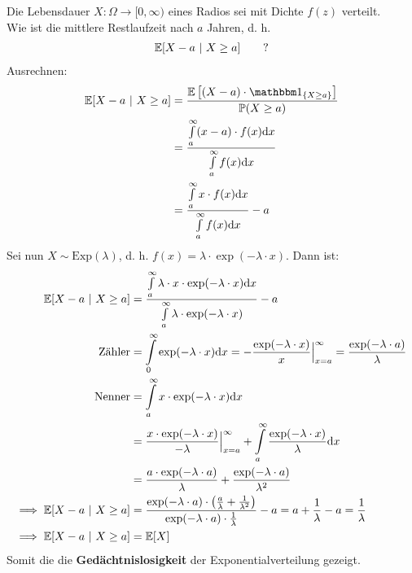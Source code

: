 \begin{beisp}[Lebensdaueranalyse]\enter
	Die Lebensdauer $X:\Omega\to[0,\infty)$ eines Radios sei mit Dichte $f(z)$ verteilt.\\
	Wie ist die mittlere Restlaufzeit nach $a$ Jahren, d. h. 
	\begin{align*}
		\mathbb{E}[X-a~|~X\geq a]\qquad?
	\end{align*}
	Ausrechnen:
	\begin{align*}
		\E[X-a~|~X\geq a] 
		&=\frac{\E\left[(X-a)\cdot\indi_{\{X\geq a\}}\right]}{\P(X\geq a)}\\
		&=\frac{\int\limits_a^\infty (x-a)\cdot f(x)\d x}{\int\limits_a^\infty f(x)\d x}\\
		&=\frac{\int\limits_a^\infty x\cdot f(x)\d x}{\int\limits_a^\infty f(x)\d x}-a
	\end{align*}
	Sei nun $X\sim\text{Exp}(\lambda)$, d. h. $f(x)=\lambda\cdot\exp(-\lambda\cdot x)$. Dann ist:
	\begin{align*}
		\mathbb{E}[X-a~|~X\geq a]
		&=\frac{\int\limits_a^\infty \lambda\cdot x\cdot\exp(-\lambda\cdot x)\mathrm{d} x}{\int\limits_a^\infty\lambda\cdot\exp(-\lambda\cdot x)}-a\\
		\text{Zähler}&=\int\limits_0^\infty\exp(-\lambda\cdot x)\mathrm{d} x=-\frac{\exp(-\lambda\cdot x)}{x}\Big|_{x=a}^\infty=\frac{\exp(-\lambda\cdot a)}{\lambda}\\
		\text{Nenner} &=\int\limits_a^\infty x\cdot\exp(-\lambda\cdot x)\mathrm{d} x\\
		&=\frac{x\cdot\exp(-\lambda\cdot x)}{-\lambda}\Big|_{x=a}^\infty+\int\limits_a^\infty\frac{\exp(-\lambda\cdot x)}{\lambda}\mathrm{d} x\\
		&=\frac{a\cdot\exp(-\lambda\cdot a)}{\lambda}+\frac{\exp(-\lambda\cdot a)}{\lambda^2}\\
		\implies
		\mathbb{E}[X-a~|~X\geq a]&=\frac{\exp(-\lambda\cdot a)\cdot\left(\frac{a}{\lambda}+\frac{1}{\lambda^2}\right)}{\exp(-\lambda\cdot a)\cdot\frac{1}{\lambda}}-a=a+\frac{1}{\lambda}-a=\frac{1}{\lambda}\\
		\implies
		\mathbb{E}[X-a~|~X\geq a]&=\mathbb{E}[X]
	\end{align*}
	Somit die die \textbf{Gedächtnislosigkeit} der Exponentialverteilung gezeigt.
\end{beisp}
